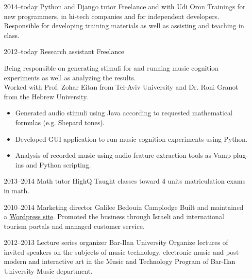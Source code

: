 \documentclass[]{friggeri-cv}  %
\begin{document}
\begin{entrylist}

    \entry
    {2014--today}
    {Python and Django tutor}
    {Freelance and with \href{http://www.10x.org.il/}{Udi Oron}}
    {Trainings for new programmers, in hi-tech companies and for independent developers. Responsible for developing training materials as well as assisting and teaching in class.}
    
\end{entrylist}
\begin{entrylist}

    \entry
    {2012--today}
    {Research assistant}
    {Freelance}
    {Being responsible on generating stimuli for and running music cognition experiments as well as analyzing the results.\\
    Worked with Prof. Zohar Eitan from Tel-Aviv University and Dr. Roni Granot from the Hebrew University.
    \begin{itemize}
    \item Generated audio stimuli using Java according to requested mathematical formulas (e.g. Shepard tones).
    \item Developed GUI application to run music cognition experiments using Python.
    \item Analysis of recorded music using audio feature extraction tools as Vamp plug-ins and Python scripting.
    \end{itemize}}
    
\end{entrylist}
\begin{entrylist}
    
    \entry
    {2013--2014}
    {Math tutor}
    {HighQ}
    {Taught classes toward 4 units matriculation exams in math.}
    
\end{entrylist}
\begin{entrylist}
    
    \entry
    {2010--2014}
    {Marketing director}
    {Galilee Bedouin Camplodge}
    {Built and maintained a \href{http://www.shevet-ahim.co.il/en/}{Wordpress site}.
    Promoted the business through Israeli and international tourism portals and managed customer service.}
    
\end{entrylist}
\begin{entrylist}

    \entry
    {2012--2013}
    {Lecture series organizer}
    {Bar-Ilan University}
    {Organize lectures of invited speakers on the subjects of music technology, electronic music and post-modern and interactive art in the Music and Technology Program of Bar-Ilan University Music department.}

\end{entrylist}
\end{document}
